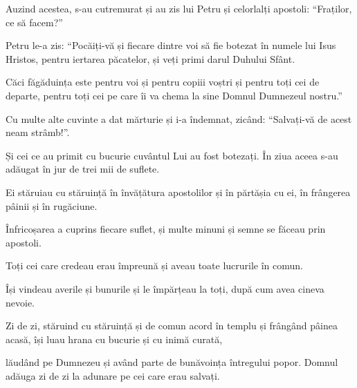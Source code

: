 {\par }{\PP {}Auzind acestea, s-au cutremurat și au zis lui Petru și celorlalți apostoli: “Fraților, ce să facem?”


\par }{\PP {}Petru le-a zis: “Pocăiți-vă și fiecare dintre voi să fie botezat în numele lui Isus Hristos, pentru iertarea păcatelor, și veți primi darul Duhului Sfânt.

Căci făgăduința este pentru voi și pentru copiii voștri și pentru toți cei de departe, pentru toți cei pe care îi va chema la sine Domnul Dumnezeul nostru.”

Cu multe alte cuvinte a dat mărturie și i-a îndemnat, zicând: “Salvați-vă de acest neam strâmb!”.


\par }{\PP {}Și cei ce au primit cu bucurie cuvântul Lui au fost botezați. În ziua aceea s-au adăugat în jur de trei mii de suflete.

Ei stăruiau cu stăruință în învățătura apostolilor și în părtășia cu ei, în frângerea pâinii și în rugăciune.

Înfricoșarea a cuprins fiecare suflet, și multe minuni și semne se făceau prin apostoli.

Toți cei care credeau erau împreună și aveau toate lucrurile în comun.

Își vindeau averile și bunurile și le împărțeau la toți, după cum avea cineva nevoie.

Zi de zi, stăruind cu stăruință și de comun acord în templu și frângând pâinea acasă, își luau hrana cu bucurie și cu inimă curată,

lăudând pe Dumnezeu și având parte de bunăvoința întregului popor. Domnul adăuga zi de zi la adunare pe cei care erau salvați.



\par }
